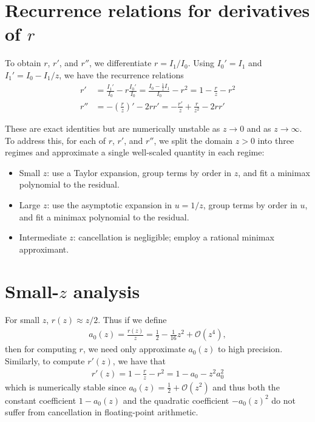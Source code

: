\documentclass{article}
\begin{document}
\section{Recurrence relations for derivatives of $r$}

To obtain $r$, $r'$, and $r''$, we differentiate $r=I_1/I_0$.
Using $I_0'=I_1$ and $I_1'=I_0 - I_1/z$, we have the recurrence relations
%
\begin{align}
  r'  & = \frac{I_1'}{I_0} - r\frac{I_0'}{I_0} = \frac{I_0 - \frac{1}{z} I_1}{I_0} - r^2 = 1 - \frac{r}{z} - r^2 \label{eq:r-prime-recurrence} \\
  r'' & = -\left(\frac{r}{z}\right)' - 2 r r' = -\frac{r'}{z} + \frac{r}{z^2} - 2 r r' \label{eq:r-second-derivative-recurrence}
\end{align}

These are exact identities but are numerically unstable as $z \to 0$ and as $z \to \infty$.
To address this, for each of $r$, $r'$, and $r''$, we split the domain $z>0$ into three regimes and approximate a single well-scaled quantity in each regime:
\begin{itemize}
  \item Small $z$: use a Taylor expansion, group terms by order in $z$, and fit a minimax polynomial to the residual.
  \item Large $z$: use the asymptotic expansion in $u = 1/z$, group terms by order in $u$, and fit a minimax polynomial to the residual.
  \item Intermediate $z$: cancellation is negligible; employ a rational minimax approximant.
\end{itemize}

\section{Small-$z$ analysis}

For small $z$, $r(z) \approx z/2$.
Thus if we define
%
\begin{align}
  a_0(z) = \frac{r(z)}{z} = \frac{1}{2} - \frac{1}{16}z^2 + \mathcal{O}(z^4),
\end{align}
%
then for computing $r$, we need only approximate $a_0(z)$ to high precision.
Similarly, to compute $r'(z)$, we have that
%
\begin{align}\label{eq:r-prime-reparametrized}
  r'(z) = 1 - \frac{r}{z} - r^2 = 1 - a_0 - z^2 a_0^2
\end{align}
%
which is numerically stable since $a_0(z) = \frac{1}{2} + \mathcal{O}(z^2)$ and thus both the constant coefficient $1 - a_0(z)$ and the quadratic coefficient $-a_0(z)^2$ do not suffer from cancellation in floating-point arithmetic.
\end{document}

